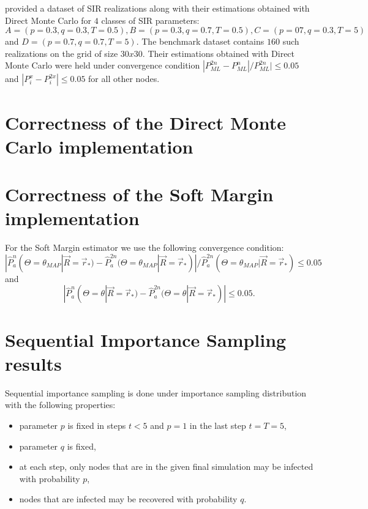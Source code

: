 \documentclass[times, utf8, diplomski]{fer}
\begin{document}
\citet{Nino} provided a dataset of SIR realizations along with their estimations obtained with Direct Monte Carlo for $4$ classes of SIR parameters: $A = (p = 0.3, q = 0.3, T =0 .5), B = (p = 0.3, q = 0.7, T = 0.5), C = (p = 07, q = 0.3, T = 5)$ and  $D = (p = 0.7, q = 0.7, T = 5)$. The benchmark dataset contains $160$ such realizations on the grid of size $30x30$.
 Their estimations obtained with Direct Monte Carlo were held under convergence condition $|P_{ML}^{2n} - P_{ML}^{n}| / P_{ML}^{2n}| \leq 0.05$  and $|P_i^x - P_i^{2x}| \leq 0.05$ for all other nodes. %

\section{Correctness of the Direct Monte Carlo implementation}

\section{Correctness of the Soft Margin implementation}
For the Soft Margin estimator we use the following convergence condition: 
\begin{equation*}
|\hat{P}_a^{n}(\Theta = \theta_{MAP} | \vec{R} = \vec{r}_*) - \hat{P}_a^{2n}(\Theta = \theta_{MAP} | \vec{R} = \vec{r}_*)| / \hat{P}_a^{2n}(\Theta = \theta_{MAP} | \vec{R} = \vec{r}_*) \leq 0.05 
\end{equation*}
and
\begin{equation*}
|\hat{P}_a^{n}(\Theta = \theta | \vec{R} = \vec{r}_*) - \hat{P}_a^{2n}(\Theta = \theta | \vec{R} = \vec{r}_*)| \leq 0.05.
\end{equation*}

\section{Sequential Importance Sampling results}
 
Sequential importance sampling is done under importance sampling distribution with the following properties:
\begin{itemize}
\item{parameter $p$ is fixed in steps $t<5$ and $p=1$ in the last step $t= T = 5$,}
\item{parameter $q$ is fixed,}
\item{at each step, only nodes that are in the given final simulation may be infected with probability $p$,}
\item{nodes that are infected may be recovered with probability $q$.}
\end{itemize}
\end{document}
